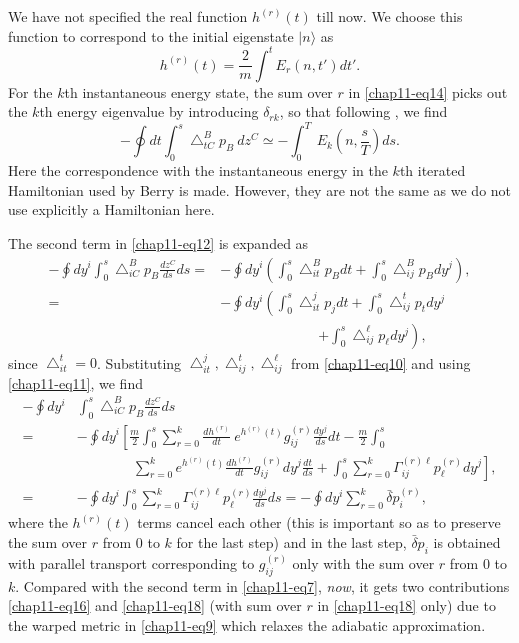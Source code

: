 We have not specified the real function $h^{(r)}(t)$ till now. We choose this function to correspond to the initial
eigenstate $|n\rangle$ as 
\begin{equation}
h^{(r)}(t)= \frac{2}{m}\int^t E_r(n,t') dt'.\label{chap11-eq15}
\end{equation}
For the $k$th instantaneous energy state, the sum over $r$ in \eqref{chap11-eq14} picks out the $k$th energy eigenvalue by  introducing ${\delta}_{rk}$, so that following \cite{chap11-key2}, we find 
\begin{equation}
-\oint dt \int_0^s {\bigtriangleup}^B_{tC}p_B\ dz^C\simeq -\int_0^T\ E_k(n,\frac{s}{T}) ds. \label{chap11-eq16}
\end{equation}
Here the correspondence with the instantaneous energy in the $k$th iterated Hamiltonian used by Berry \cite{chap11-key5} is made. However, they are not the same as we do not use explicitly a Hamiltonian here.

The second term in \eqref{chap11-eq12} is expanded as  
\begin{align}
	-\oint dy^i\int_0^s{\bigtriangleup}^B_{iC} p_B\frac{dz^C}{ds}ds= &-\oint dy^i\left( \int_0^s {\bigtriangleup}^B_{it}
	p_B dt+\int_0^s{\bigtriangleup}^B_{ij}p_B dy^j\right), \nonumber \\
	= &-\oint dy^i\left(\int_0^s{\bigtriangleup}^j_{it}p_j dt+\int_0^s{\bigtriangleup}^t_{ij}p_t dy^j \right. \nonumber \\
	& \qquad \qquad \qquad \quad \left.+\int_0^s {\bigtriangleup}^{\ell}_{ij}p_{\ell} dy^j\right),\label{chap11-eq17}
\end{align}
since ${\bigtriangleup}^t_{it}=0$. Substituting ${\bigtriangleup}^j_{it}, {\bigtriangleup}^t_{ij},{\bigtriangleup}^{\ell}
_{ij}$ from \eqref{chap11-eq10} and using \eqref{chap11-eq11}, we find 
\begin{align}
	-\oint dy^i & \int_0^s{\bigtriangleup}^B_{iC} p_B\frac{dz^C}{ds}ds\nonumber \\
	= &-\oint dy^i \left[ \frac{m}{2}\int_0^s \sum_{r=0}^k\frac{dh^{(r)}}{dt}\ e^{h^{(r)}(t)}g^{(r)}_{ij}\frac{dy^j}{ds} dt -\frac{m}{2}\int_0^s\right.\nonumber\\ 
	& \qquad \qquad  \left.\sum_{r=0}^k e^{h^{(r)}(t)}\frac{dh^{(r)}}{dt}g^{(r)}_{ij} dy^j\frac{dt}{ds} + \int_0^s\sum_{r=0}^k{\Gamma}^{(r) \ell}_{ij}p_{\ell}^{(r)} dy^j \right], \nonumber \\
	= &-\oint dy^i\int_0^s\sum_{r=0}^k {\Gamma}^{(r)\ell}_{ij}p^{(r)}_{\ell}\frac{dy^j}{ds} ds
	= -\oint dy^i\sum_{r=0}^k \bar{\delta} p_i^{(r)}, \label{chap11-eq18}
\end{align}
where the $h^{(r)}(t)$ terms cancel each other (this is important so as to preserve the sum over $r$ from $0$ to $k$ for  the last step) and in the last step, $\bar{\delta}p_i$ is  obtained with parallel transport corresponding to $g^{(r)}_{ij}$ only with the sum over $r$ from $0$ to $k$.  Compared with the second term in \eqref{chap11-eq7},  {\it{now}}, it gets two contributions \eqref{chap11-eq16} and \eqref{chap11-eq18} (with sum over $r$ in \eqref{chap11-eq18} only)   due to the warped metric in \eqref{chap11-eq9} which relaxes the adiabatic approximation.

